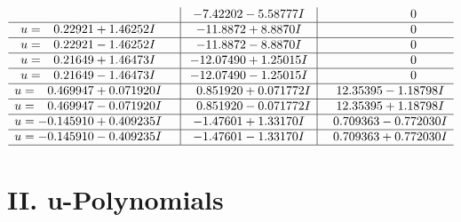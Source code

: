 \documentclass[1p]{elsarticle_modified}
\theoremstyle{definition}
\begin{document}
$$\begin{array}{c|c|c}
 & -7.42202 - 5.58777 I & \phantom{-0.000000 } 0 \\ \hline\begin{aligned}
u &= \phantom{-}0.22921 + 1.46252 I\end{aligned}
 & -11.8872 + 8.8870 I & \phantom{-0.000000 } 0 \\ \hline\begin{aligned}
u &= \phantom{-}0.22921 - 1.46252 I\end{aligned}
 & -11.8872 - 8.8870 I & \phantom{-0.000000 } 0 \\ \hline\begin{aligned}
u &= \phantom{-}0.21649 + 1.46473 I\end{aligned}
 & -12.07490 + 1.25015 I & \phantom{-0.000000 } 0 \\ \hline\begin{aligned}
u &= \phantom{-}0.21649 - 1.46473 I\end{aligned}
 & -12.07490 - 1.25015 I & \phantom{-0.000000 } 0 \\ \hline\begin{aligned}
u &= \phantom{-}0.469947 + 0.071920 I\end{aligned}
 & \phantom{-}0.851920 + 0.071772 I & \phantom{-}12.35395 - 1.18798 I \\ \hline\begin{aligned}
u &= \phantom{-}0.469947 - 0.071920 I\end{aligned}
 & \phantom{-}0.851920 - 0.071772 I & \phantom{-}12.35395 + 1.18798 I \\ \hline\begin{aligned}
u &= -0.145910 + 0.409235 I\end{aligned}
 & -1.47601 + 1.33170 I & \phantom{-}0.709363 - 0.772030 I \\ \hline\begin{aligned}
u &= -0.145910 - 0.409235 I\end{aligned}
 & -1.47601 - 1.33170 I & \phantom{-}0.709363 + 0.772030 I\\
 \hline 
 \end{array}$$\newpage
\newpage\renewcommand{\arraystretch}{1}
\centering \section*{ II. u-Polynomials}
\end{document}
